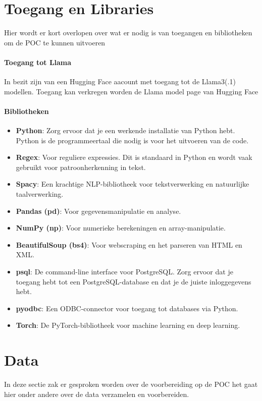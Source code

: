 \section{Toegang en Libraries}
Hier wordt er kort overlopen over wat er nodig is van toegangen en bibliotheken om de POC te kunnen uitvoeren
\paragraph{Toegang tot Llama}
 In bezit zijn van een Hugging Face aacount met toegang tot de Llama3(.1) modellen. Toegang kan verkregen worden de Llama model page van Hugging Face
\paragraph{Bibliotheken}
\begin{itemize}
    \item \textbf{Python}: Zorg ervoor dat je een werkende installatie van Python hebt. Python is de programmeertaal die nodig is voor het uitvoeren van de code.
    \item \textbf{Regex}: Voor reguliere expressies. Dit is standaard in Python en wordt vaak gebruikt voor patroonherkenning in tekst.
    \item \textbf{Spacy}: Een krachtige NLP-bibliotheek voor tekstverwerking en natuurlijke taalverwerking.
    \item \textbf{Pandas (pd)}: Voor gegevensmanipulatie en analyse.
    \item \textbf{NumPy (np)}: Voor numerieke berekeningen en array-manipulatie.
    \item \textbf{BeautifulSoup (bs4)}: Voor webscraping en het parseren van HTML en XML.
    \item \textbf{psql}: De command-line interface voor PostgreSQL. Zorg ervoor dat je toegang hebt tot een PostgreSQL-database en dat je de juiste inloggegevens hebt.
    \item \textbf{pyodbc}: Een ODBC-connector voor toegang tot databases via Python.
    \item \textbf{Torch}: De PyTorch-bibliotheek voor machine learning en deep learning.
\end{itemize}


\section{Data}
In deze sectie zak er gesproken worden over de voorbereiding op de POC het gaat hier onder andere over de data verzamelen en voorbereiden.

